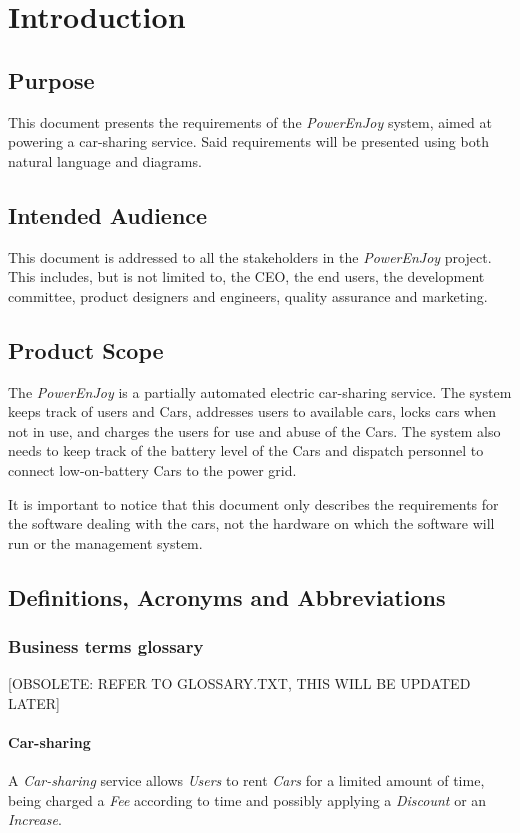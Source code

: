 \section{Introduction}
\subsection{Purpose}
This document presents the requirements of the \emph{PowerEnJoy} system, aimed at powering a car-sharing service. Said requirements will be presented using both natural language and diagrams.
\subsection{Intended Audience}
This document is addressed to all the stakeholders in the \emph{PowerEnJoy} project. This includes, but is not limited to, the CEO, the end users, the development committee, product designers and engineers, quality assurance and marketing.
\subsection{Product Scope}
The \emph{PowerEnJoy} is a partially automated electric car-sharing service. The system keeps track of users and Cars, addresses users to available cars, locks cars when not in use, and charges the users for use and abuse of the Cars. The system also needs to keep track of the battery level of the Cars and dispatch personnel to connect low-on-battery Cars to the power grid.

It is important to notice that this document only describes the requirements for the software dealing with the cars, not the hardware on which the software will run or the management system.
\subsection{Definitions, Acronyms and Abbreviations}
\subsubsection{Business terms glossary}
[OBSOLETE: REFER TO GLOSSARY.TXT, THIS WILL BE UPDATED LATER]
\paragraph{Car-sharing}
A \emph{Car-sharing} service allows \emph{Users} to rent \emph{Cars} for a limited amount of time, being charged a \emph{Fee} according to time and possibly applying a \emph{Discount} or an \emph{Increase}.
